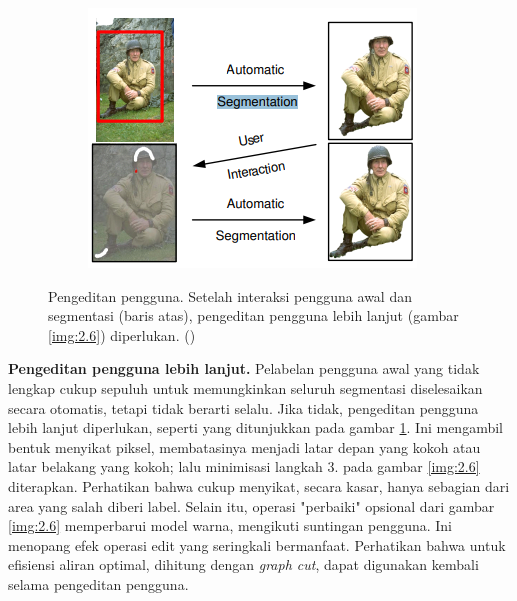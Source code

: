 \begin{figure}[H]
  \centering
    \begin{subfigure}{0.5\textwidth}
      \centering{}
      \includegraphics[width=\textwidth]{gambar/gambar-2_8.png}
    \end{subfigure}     
  \caption{
    Pengeditan pengguna. Setelah interaksi pengguna awal dan segmentasi (baris atas), 
    pengeditan pengguna lebih lanjut (gambar \ref{img:2.6}) diperlukan. (\cite{Rother:2004})
    }
    \label{img:2.8}
\end{figure}

\textbf{Pengeditan pengguna lebih lanjut.} Pelabelan pengguna awal yang tidak lengkap 
cukup sepuluh untuk memungkinkan seluruh segmentasi diselesaikan secara otomatis, 
tetapi tidak berarti selalu. Jika tidak, pengeditan pengguna lebih lanjut diperlukan, 
seperti yang ditunjukkan pada gambar \ref{img:2.8}. Ini mengambil bentuk menyikat piksel, membatasinya 
menjadi latar depan yang kokoh atau latar belakang yang kokoh; lalu minimisasi 
langkah 3. pada gambar \ref{img:2.6} diterapkan. Perhatikan bahwa cukup menyikat, secara 
kasar, hanya sebagian dari area yang salah diberi label. Selain itu, operasi "perbaiki" 
opsional dari gambar \ref{img:2.6} memperbarui model warna, mengikuti suntingan pengguna. Ini 
menopang efek operasi edit yang seringkali bermanfaat. Perhatikan bahwa untuk efisiensi 
aliran optimal, dihitung dengan \emph{graph cut}, dapat digunakan kembali selama 
pengeditan pengguna.

